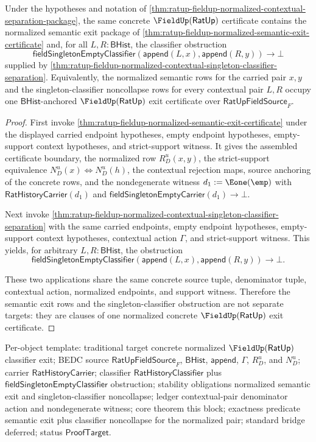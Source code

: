 \begin{theorem}
\label{thm:ratup-fieldup-normalized-semantic-classifier-exit-certificate}
Under the hypotheses and notation of
\autoref{thm:ratup-fieldup-normalized-contextual-separation-package}, the same
concrete $\FieldUp(\mathsf{RatUp})$ certificate contains the normalized
semantic exit package of
\autoref{thm:ratup-fieldup-normalized-semantic-exit-certificate} and, for all
$L,R:\mathsf{BHist}$, the classifier obstruction
$$
\mathsf{fieldSingletonEmptyClassifier}(\mathsf{append}(L,x),\mathsf{append}(R,y))
\to\bot
$$
supplied by
\autoref{thm:ratup-fieldup-normalized-contextual-singleton-classifier-separation}.
Equivalently, the normalized semantic rows for the carried pair $x,y$ and the
singleton-classifier noncollapse rows for every contextual pair $L,R$ occupy
one $\mathsf{BHist}$-anchored $\FieldUp(\mathsf{RatUp})$ exit certificate over
$\mathsf{RatUpFieldSource}_F$.
\end{theorem}
\begin{proof}
First invoke
\autoref{thm:ratup-fieldup-normalized-semantic-exit-certificate} under the
displayed carried endpoint hypotheses, empty endpoint hypotheses,
empty-support context hypotheses, and strict-support witness. It gives the
assembled certificate boundary, the normalized row $R_D^u(x,y)$, the
strict-support equivalence $N_D^u(x)\Longleftrightarrow N_D^u(h)$, the
contextual rejection maps, source anchoring of the concrete rows, and the
nondegenerate witness $d_1:=\Eone(\emp)$ with
$\mathsf{RatHistoryCarrier}(d_1)$ and
$\mathsf{fieldSingletonEmptyCarrier}(d_1)\to\bot$.

Next invoke
\autoref{thm:ratup-fieldup-normalized-contextual-singleton-classifier-separation}
with the same carried endpoints, empty endpoint hypotheses, empty-support
context hypotheses, contextual action $\Gamma$, and strict-support witness.
This yields, for arbitrary $L,R:\mathsf{BHist}$, the obstruction
$$
\mathsf{fieldSingletonEmptyClassifier}(\mathsf{append}(L,x),\mathsf{append}(R,y))
\to\bot.
$$

These two applications share the same concrete source tuple, denominator
tuple, contextual action, normalized endpoints, and support witness. Therefore
the semantic exit rows and the singleton-classifier obstruction are not
separate targets: they are clauses of one normalized concrete
$\FieldUp(\mathsf{RatUp})$ exit certificate.
\end{proof}

Per-object template: traditional target concrete normalized
$\FieldUp(\mathsf{RatUp})$ classifier exit; BEDC source
$\mathsf{RatUpFieldSource}_F$, $\mathsf{BHist}$, $\mathsf{append}$, $\Gamma$,
$R_D^u$, and $N_D^u$; carrier $\mathsf{RatHistoryCarrier}$; classifier
$\mathsf{RatHistoryClassifier}$ plus
$\mathsf{fieldSingletonEmptyClassifier}$ obstruction; stability obligations
normalized semantic exit and singleton-classifier noncollapse; ledger
contextual-pair denominator action and nondegenerate witness; core theorem this
block; exactness predicate semantic exit plus classifier noncollapse for the
normalized pair; standard bridge deferred; status $\mathsf{ProofTarget}$.

